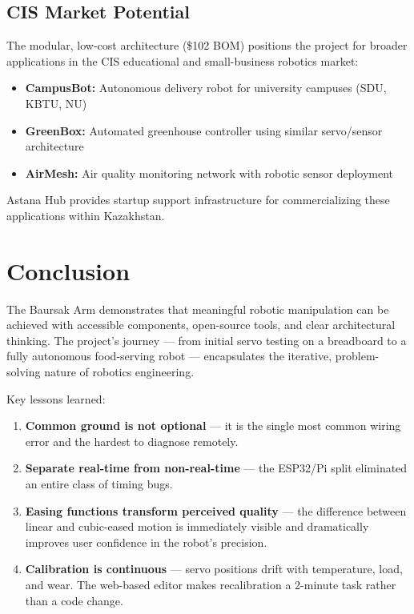 \documentclass[12pt,a4paper]{article}
\begin{document}
\subsection{CIS Market Potential}

The modular, low-cost architecture (\$102 BOM) positions the project for broader applications in the CIS educational and small-business robotics market:

\begin{itemize}[leftmargin=2cm]
    \item \textbf{CampusBot:} Autonomous delivery robot for university campuses (SDU, KBTU, NU)
    \item \textbf{GreenBox:} Automated greenhouse controller using similar servo/sensor architecture
    \item \textbf{AirMesh:} Air quality monitoring network with robotic sensor deployment
\end{itemize}

Astana Hub provides startup support infrastructure for commercializing these applications within Kazakhstan.

\section{Conclusion}

The Baursak Arm demonstrates that meaningful robotic manipulation can be achieved with accessible components, open-source tools, and clear architectural thinking. The project's journey --- from initial servo testing on a breadboard to a fully autonomous food-serving robot --- encapsulates the iterative, problem-solving nature of robotics engineering.

Key lessons learned:

\begin{enumerate}[leftmargin=2cm]
    \item \textbf{Common ground is not optional} --- it is the single most common wiring error and the hardest to diagnose remotely.
    \item \textbf{Separate real-time from non-real-time} --- the ESP32/Pi split eliminated an entire class of timing bugs.
    \item \textbf{Easing functions transform perceived quality} --- the difference between linear and cubic-eased motion is immediately visible and dramatically improves user confidence in the robot's precision.
    \item \textbf{Calibration is continuous} --- servo positions drift with temperature, load, and wear. The web-based editor makes recalibration a 2-minute task rather than a code change.
\end{enumerate}
\end{document}
